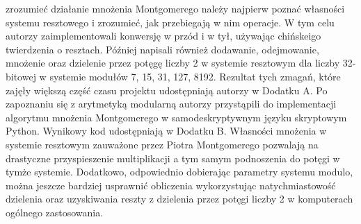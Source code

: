 \documentclass[10pt,journal,compsoc]{IEEEtran}
\begin{document}
 zrozumieć działanie mnożenia Montgomerego należy najpierw poznać własności systemu resztowego i zrozumieć, jak przebiegają w nim operacje. W tym celu autorzy zaimplementowali konwersję w przód i w tył, używając chińskeigo twierdzenia o resztach. Później napisali również dodawanie, odejmowanie, mnożenie oraz dzielenie przez potęgę liczby 2 w systemie resztowym dla liczby 32-bitowej w systemie modułów 7, 15, 31, 127, 8192. Rezultat tych zmagań, które zajęły większą część czasu projektu udostępniają autorzy w Dodatku A. Po zapoznaniu się z arytmetyką modularną autorzy przystąpili do implementacji algorytmu mnożenia Montgomerego w samodeskryptywnym języku skryptowym Python. Wynikowy kod udostępniają w Dodatku B. Własności mnożenia w systemie resztowym zauważone przez Piotra Montgomerego pozwalają na drastyczne przyspieszenie multiplikacji a tym samym podnoszenia do potęgi w tymże systemie. Dodatkowo, odpowiednio dobierając parametry systemu modulo, można jeszcze bardziej usprawnić obliczenia wykorzystując natychmiastowość dzielenia oraz uzyskiwania reszty z dzielenia przez potęgi liczby 2 w komputerach ogólnego zastosowania.


%
%

\end{document}
